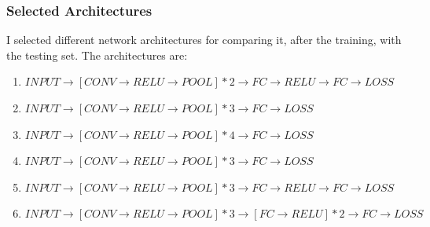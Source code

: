 \documentclass{beamer}
\begin{document}
\begin{frame}
\frametitle{Selected Architectures}

I selected different network architectures for comparing it, after the training, with the testing set. The architectures are:

\begin{enumerate}

\item $ INPUT \rightarrow [CONV \rightarrow RELU \rightarrow POOL]*2 \rightarrow FC \rightarrow RELU \rightarrow FC \rightarrow LOSS $ 

\item $ INPUT \rightarrow [CONV \rightarrow RELU \rightarrow POOL]*3 \rightarrow FC \rightarrow LOSS $ 

\item $ INPUT \rightarrow [CONV \rightarrow RELU \rightarrow POOL]*4 \rightarrow FC \rightarrow LOSS $ 

\item $ INPUT \rightarrow [CONV \rightarrow RELU \rightarrow POOL]*3 \rightarrow FC \rightarrow LOSS $ 

\item $ INPUT \rightarrow [CONV \rightarrow RELU \rightarrow POOL]*3 \rightarrow FC \rightarrow RELU \rightarrow FC \rightarrow LOSS $ 

\item $ INPUT \rightarrow [CONV \rightarrow RELU \rightarrow POOL]*3 \rightarrow [FC \rightarrow RELU]*2 \rightarrow FC \rightarrow LOSS $ 

\end{enumerate}

\end{frame}

\end{document}
